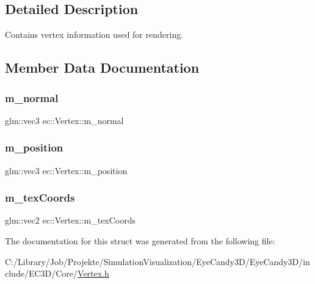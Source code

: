 \subsection{Detailed Description}
Contains vertex information used for rendering. 

\subsection{Member Data Documentation}
\mbox{\label{structec_1_1_vertex_aec5eb9b7fc72c250525c6b64bfabd2a2}} 
\subsubsection{\texorpdfstring{m\+\_\+normal}{m\_normal}}
{\footnotesize\ttfamily glm\+::vec3 ec\+::\+Vertex\+::m\+\_\+normal}

\mbox{\label{structec_1_1_vertex_acb3327c996406e4d1a6b43cfa1f3ea47}} 
\subsubsection{\texorpdfstring{m\+\_\+position}{m\_position}}
{\footnotesize\ttfamily glm\+::vec3 ec\+::\+Vertex\+::m\+\_\+position}

\mbox{\label{structec_1_1_vertex_a12e2b45d0fdb3873a01dd9ada9e66f64}} 
\subsubsection{\texorpdfstring{m\+\_\+tex\+Coords}{m\_texCoords}}
{\footnotesize\ttfamily glm\+::vec2 ec\+::\+Vertex\+::m\+\_\+tex\+Coords}



The documentation for this struct was generated from the following file\+:\begin{DoxyCompactItemize}
\item 
C\+:/\+Library/\+Job/\+Projekte/\+Simulation\+Visualization/\+Eye\+Candy3\+D/\+Eye\+Candy3\+D/include/\+E\+C3\+D/\+Core/\mbox{\hyperlink{_vertex_8h}{Vertex.\+h}}\end{DoxyCompactItemize}
